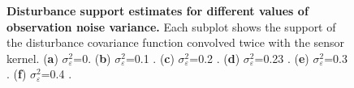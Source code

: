 \documentclass[]{article}
\begin{document}
\begin{figure}[!ht]
\caption{{\bf Disturbance support estimates for different values of observation noise variance.} Each subplot shows the support of the disturbance covariance function convolved twice with the sensor kernel. (\textbf a) $\sigma_{\varepsilon}^2$=0. (\textbf b) $\sigma_{\varepsilon}^2$=0.1 . (\textbf c) $\sigma_{\varepsilon}^2$=0.2 .  (\textbf d) $\sigma_{\varepsilon}^2$=0.23 .  (\textbf e) $\sigma_{\varepsilon}^2$=0.3 . (\textbf f) $\sigma_{\varepsilon}^2$=0.4 .}
\label{fig:DisturbanceSupportExperiment}
\end{figure}
\end{document}
